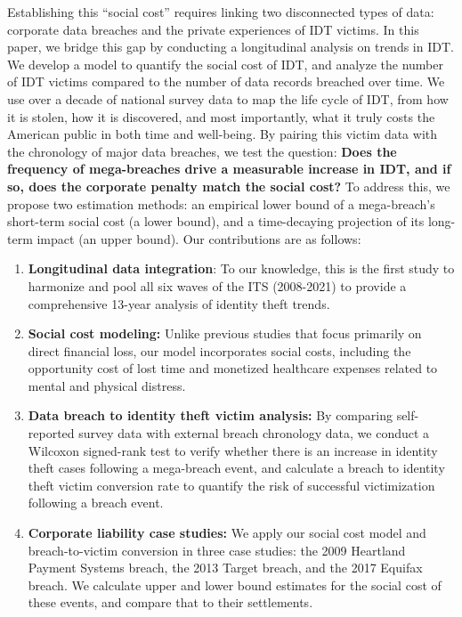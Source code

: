 Establishing this ``social cost'' requires linking two disconnected types of data: corporate data breaches and the private experiences of IDT victims. In this paper, we bridge this gap by conducting a longitudinal analysis on trends in IDT. We develop a model to quantify the social cost of IDT, and analyze the number of IDT victims compared to the number of data records breached over time. We use over a decade of national survey data to map the life cycle of IDT, from how it is stolen, how it is discovered, and most importantly, what it truly costs the American public in both time and well-being. By pairing this victim data with the chronology of major data breaches, we test the question: \textbf{Does the frequency of mega-breaches drive a measurable increase in IDT, and if so, does the corporate penalty match the social cost?} To address this, we propose two estimation methods: an empirical lower bound of a mega-breach's short-term social cost (a lower bound), and a time-decaying projection of its long-term impact (an upper bound).
Our contributions are as follows:

\begin{enumerate}
    \item \textbf{Longitudinal data integration}: To our knowledge, this is the first study to harmonize and pool all six waves of the ITS (2008-2021) to provide a comprehensive 13-year analysis of identity theft trends.
    \item \textbf{Social cost modeling:} Unlike previous studies that focus primarily on direct financial loss, our model incorporates social costs, including the opportunity cost of lost time and monetized healthcare expenses related to mental and physical distress.
    \item \textbf{Data breach to identity theft victim analysis:} By comparing self-reported survey data with external breach chronology data, we conduct a Wilcoxon signed-rank test to verify whether there is an increase in identity theft cases following a mega-breach event, and calculate a breach to identity theft victim conversion rate to quantify the risk of successful victimization following a breach event. 
    \item \textbf{Corporate liability case studies:} We apply our social cost model and breach-to-victim conversion in three case studies: the 2009 Heartland Payment Systems breach, the 2013 Target breach, and the 2017 Equifax breach. We calculate upper and lower bound estimates for the social cost of these events, and compare that to their settlements.
\end{enumerate}

